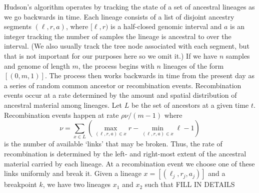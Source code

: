 \documentclass{article}
\begin{document}
Hudson's algorithm operates by tracking the state of a set of ancestral
lineages as we go backwards in time.
%
Each lineage consists of a list of
disjoint ancestry segments $(\ell, r, a)$, where
$[\ell, r)$ is a half-closed genomic interval and $a$ is an integer
tracking the number of samples the lineage is ancestral to over the interval.
(We also usually track the tree node associated with each segment, but
that is not important for our purposes here so we omit it.)
If we have $n$ samples and genome of length $m$, the process begins with $n$ lineages
of the form $[(0, m, 1)]$. The process then works backwards in time from
the present day as a series of random common ancestor or recombination events.
Recombination events occur at a rate determined by the amount and spatial
distribution of ancestral material among lineages.
Let $L$ be the set of ancestors at a given time $t$. Recombination events
happen at rate $\rho \nu / (m - 1)$ where
\[
\nu = \sum_{x \in L}\left( \max_{(\ell, r, a) \in x}r
    - \min_{(\ell, r, a) \in x}\ell - 1 \right)
\]
is the number of available `links' that may be broken. Thus, the rate of
recombination is determined by the left- and right-most extent of the
ancestral material carried by each lineage. At a recombination
event we choose one of these links uniformly and break it. Given a lineage
$x = [(\ell_j, r_j, a_j)]$ and a breakpoint $k$, we have two lineages
$x_1$ and $x_2$ such that FILL IN DETAILS
\end{document}
